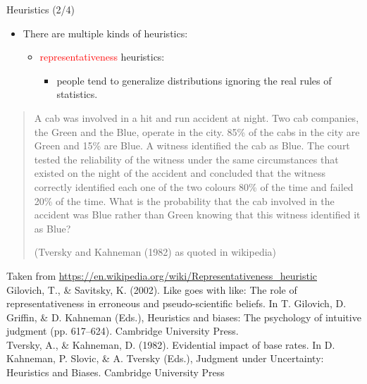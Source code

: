 \documentclass{beamer}
\begin{document}
\begin{frame}
{\centerline{Heuristics (2/4)}}

\begin{itemize}
    \item There are multiple kinds of heuristics:
    \begin{itemize}
        \item \textcolor{red}{representativeness} heuristics:
             \begin{itemize}
                       \item people tend to generalize distributions ignoring the real rules of statistics.
             \end{itemize} 
         \end{itemize} 
\end{itemize} 

       \begin{quote}
 \scriptsize
 A cab was involved in a hit and run accident at night. Two cab companies, the Green and the Blue, operate in the city. 85\% of the cabs in the city are Green and 15\% are Blue.  A witness identified the cab as Blue. The court tested the reliability of the witness under the same circumstances that existed on the night of the accident and concluded that the witness correctly identified each one of the two colours 80\% of the time and failed 20\% of the time. What is the probability that the cab involved in the accident was Blue rather than Green knowing that this witness identified it as Blue? 
 
 {\normalfont \scriptsize (Tversky and Kahneman (1982) as quoted in wikipedia)}

       \end{quote}
\begin{center}
    \tiny{Taken from \url{https://en.wikipedia.org/wiki/Representativeness_heuristic} \\
  Gilovich, T., \& Savitsky, K. (2002). Like goes with like: The role of representativeness in erroneous and pseudo-scientific beliefs. In T. Gilovich, D. Griffin, \& D. Kahneman (Eds.), Heuristics and biases: The psychology of intuitive judgment (pp. 617–624). Cambridge University Press.\\
  Tversky, A., \& Kahneman, D. (1982). Evidential impact of base rates. In D. Kahneman, P. Slovic, \& A. Tversky (Eds.), Judgment under Uncertainty: Heuristics and Biases. Cambridge University Press}
\end{center}

\end{frame}
\end{document}
